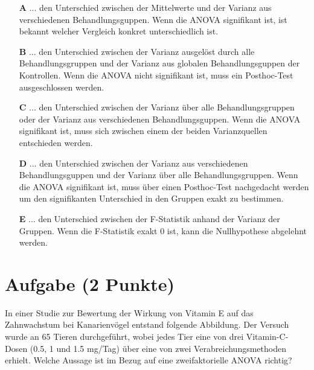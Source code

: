 \documentclass[a4paper, 9pt]{scrartcl}\usepackage[]{graphicx}\usepackage[]{xcolor}
\begin{document}
\begin{enumerate}
\item [\textbf{A} \msquare] ... den Unterschied zwischen der Mittelwerte und der Varianz aus verschiedenen Behandlungsguppen. Wenn die ANOVA signifikant ist, ist bekannt welcher Vergleich konkret unterschiedlich ist.
\item [\textbf{B} \msquare] ... den Unterschied zwischen der Varianz ausgelöst durch alle Behandlungsgruppen und der Varianz aus globalen Behandlungsguppen der Kontrollen. Wenn die ANOVA nicht signifikant ist, muss ein Posthoc-Test ausgeschlossen werden.
\item [\textbf{C} \msquare] ... den Unterschied zwischen der Varianz über alle Behandlungsgruppen oder der Varianz aus verschiedenen Behandlungsguppen. Wenn die ANOVA signifikant ist, muss sich zwischen einem der beiden Varianzquellen entschieden werden.
\item [\textbf{D} \msquare] ... den Unterschied zwischen der Varianz aus verschiedenen Behandlungsguppen und der Varianz über alle Behandlungsgruppen. Wenn die ANOVA signifikant ist, muss über einen Posthoc-Test nachgedacht werden um den signifikanten Unterschied in den Gruppen exakt zu bestimmen.
\item [\textbf{E} \msquare] ... den Unterschied zwischen der F-Statistik anhand der Varianz der Gruppen. Wenn die F-Statistik exakt 0 ist, kann die Nullhypothese abgelehnt werden.
\end{enumerate} 

\section{Aufgabe \hfill (2 Punkte)}



In einer Studie zur Bewertung der Wirkung von Vitamin E auf das Zahnwachstum bei Kanarienvögel entstand folgende Abbildung. Der Versuch wurde an 65 Tieren durchgeführt, wobei jedes Tier eine von  drei Vitamin-C-Dosen (0.5, 1 und 1.5 mg/Tag) über eine von zwei Verabreichungsmethoden erhielt. Welche Aussage ist im Bezug auf eine zweifaktorielle ANOVA richtig?
\end{document}
